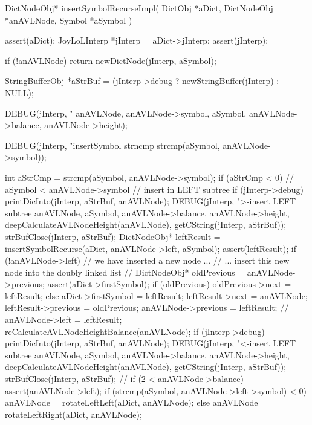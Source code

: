\startCCode
DictNodeObj* insertSymbolRecurseImpl(
  DictObj     *aDict,
  DictNodeObj *anAVLNode,
  Symbol      *aSymbol
) {
  assert(aDict);
  JoyLoLInterp *jInterp = aDict->jInterp;
  assert(jInterp);
  
  if (!anAVLNode) return newDictNode(jInterp, aSymbol);

  StringBufferObj *aStrBuf = 
    (jInterp->debug ? newStringBuffer(jInterp) : NULL);

  DEBUG(jInterp, "\ninsertSymbol %
        anAVLNode, anAVLNode->symbol, aSymbol,
        anAVLNode->balance, anAVLNode->height);

  DEBUG(jInterp, "insertSymbol strncmp %
        strcmp(aSymbol, anAVLNode->symbol));

  int aStrCmp = strcmp(aSymbol, anAVLNode->symbol);
  if (aStrCmp < 0) {
    // aSymbol < anAVLNode->symbol // insert in LEFT subtree
    if (jInterp->debug) {
      printDicInto(jInterp, aStrBuf, anAVLNode);
      DEBUG(jInterp, ">-insert LEFT subtree %
            anAVLNode, aSymbol, anAVLNode->balance,
            anAVLNode->height, deepCalculateAVLNodeHeight(anAVLNode),
            getCString(jInterp, aStrBuf));
      strBufClose(jInterp, aStrBuf);
    }
    DictNodeObj* leftResult =
      insertSymbolRecurse(aDict, anAVLNode->left, aSymbol);
    assert(leftResult);
    if (!anAVLNode->left) {
      // we have inserted a new node ...
      // ... insert this new node into the doubly linked list
      //
      DictNodeObj* oldPrevious           = anAVLNode->previous;
      assert(aDict->firstSymbol);
      if (oldPrevious) oldPrevious->next = leftResult;
      else aDict->firstSymbol            = leftResult;
      leftResult->next                   = anAVLNode;
      leftResult->previous               = oldPrevious;
      anAVLNode->previous                = leftResult;
      //
    }
    anAVLNode->left = leftResult;
    reCalculateAVLNodeHeightBalance(anAVLNode);
    if (jInterp->debug) {
      printDicInto(jInterp, aStrBuf, anAVLNode);
      DEBUG(jInterp, "<-insert LEFT subtree %
          anAVLNode, aSymbol, anAVLNode->balance,
          anAVLNode->height, deepCalculateAVLNodeHeight(anAVLNode),
          getCString(jInterp, aStrBuf));
      strBufClose(jInterp, aStrBuf);
    }
    //
    if (2 < anAVLNode->balance) {
      assert(anAVLNode->left);
      if (strcmp(aSymbol, anAVLNode->left->symbol) < 0) {
        anAVLNode = rotateLeftLeft(aDict, anAVLNode);
      } else {
        anAVLNode = rotateLeftRight(aDict, anAVLNode);
}}}}
